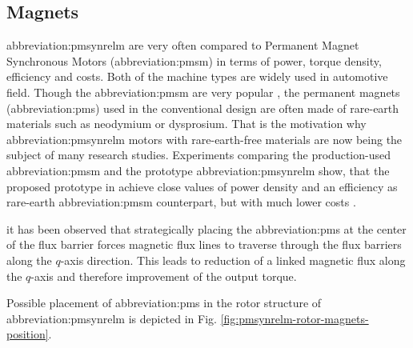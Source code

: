 \documentclass[a4paper, twoside, 11pt]{article}
\begin{document}
    \subsection{Magnets}
        \gls{abbreviation:pmsynrelm} are very often compared to Permanent Magnet Synchronous Motors (\gls{abbreviation:pmsm}) in terms of power, torque density, efficiency and costs. Both of the machine types are widely used in automotive field. Though the \gls{abbreviation:pmsm} are very popular \cite{morimoto-experimental-evaulation-of-a-rare-earth-free-pmasynrm-with-ferrite-magnets-for-automotive-applications}, the permanent magnets (\gls{abbreviation:pm}s) used in the conventional design are often made of rare-earth materials such as neodymium or dysprosium. That is the motivation why \gls{abbreviation:pmsynrelm} motors with rare-earth-free materials are now being the subject of many research studies. Experiments comparing the production-used \gls{abbreviation:pmsm} and the prototype \gls{abbreviation:pmsynrelm} show, that the proposed prototype in \cite{mashiro-performance-of-mpasynrm-with-ferrite-magnets-for-ev-hv-applications-considering-productivity} achieve close values of power density and an efficiency as rare-earth \gls{abbreviation:pmsm} counterpart, but with much lower costs \cite{haiwei-low-cost-ferrite-pm-assisted-synchronous-reluctance-machine-for-electric-vehicles}.\par
it has been observed that strategically placing the \gls{abbreviation:pm}s at the center of the flux barrier forces magnetic flux lines to traverse through the flux barriers along the $q$-axis direction. This leads to reduction of a linked magnetic flux along the $q$-axis and therefore improvement of the output torque. \cite{ibrahim-permanent-magnet-assisted-synchronous-reluctance-motor-employing-a-hybrid-star-delta-winding-for-high-speed-applicaitons, ngo-performance-analysis-of-synchronous-reluctance-motor-with-limited-amount-of-permanent-magnet}\par
Possible placement of \gls{abbreviation:pm}s in the rotor structure of \gls{abbreviation:pmsynrelm} is depicted in Fig. \ref{fig:pmsynrelm-rotor-magnets-position}.
\end{document}
